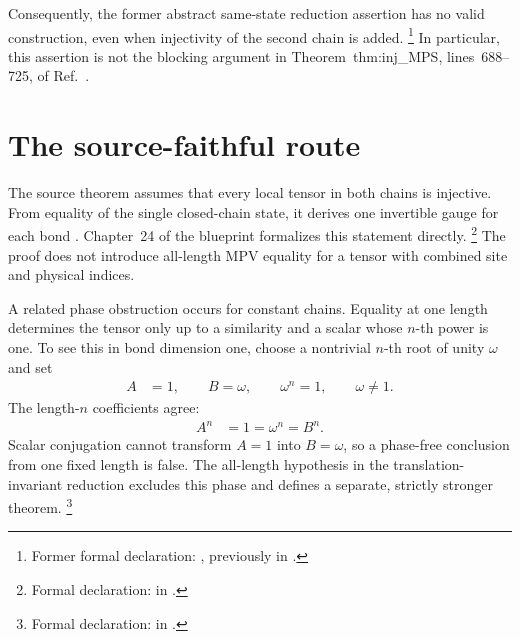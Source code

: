\documentclass{article}
\begin{document}
Consequently, the former abstract same-state reduction assertion has no valid
construction, even when injectivity of the second chain is added.%
\footnote{Former formal declaration:
    , previously in
    .}
In particular, this assertion is not the blocking argument in
Theorem~\textup{thm:inj\_MPS}, lines~688--725, of
Ref.~\cite{Molnar2018NormalPEPS}.

\section{The source-faithful route}

The source theorem assumes that every local tensor in both chains is
injective. From equality of the single closed-chain state, it derives one
invertible gauge for each bond
\cite[Theorem~\textup{thm:inj\_MPS}, lines~688--725]{Molnar2018NormalPEPS}.
Chapter~24 of the blueprint formalizes this statement directly.%
\footnote{Formal declaration:
    in .}
The proof does not introduce all-length MPV equality for a tensor with
combined site and physical indices.

A related phase obstruction occurs for constant chains. Equality at one length
determines the tensor only up to a similarity and a scalar whose $n$-th power
is one. To see this in bond dimension one, choose a nontrivial $n$-th root of
unity $\omega$ and set
\begin{align}
    A
        &=
        1,
    \qquad
    B
        =
        \omega,
    \qquad
    \omega^n
        =
        1,
    \qquad
    \omega
        \neq
        1.
    \label{eq:tnlean_algebraic_ft_same_state_combined_mpv_gap_root_of_unity_example}
\end{align}
The length-$n$ coefficients agree:
\begin{align}
    A^n
        &=
        1
        =
        \omega^n
        =
        B^n.
    \label{eq:tnlean_algebraic_ft_same_state_combined_mpv_gap_fixed_length_phase_equality}
\end{align}
Scalar conjugation cannot transform $A=1$ into $B=\omega$, so a phase-free
conclusion from one fixed length is false. The all-length hypothesis in the
translation-invariant reduction excludes this phase and defines a separate,
strictly stronger theorem.%
\footnote{Formal declaration:
     in
    .}
\end{document}
